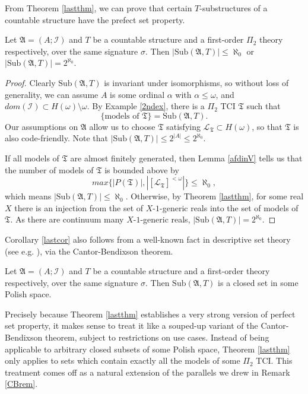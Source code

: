 \documentclass[12pt]{article}
\numberwithin{equation}{section}
\begin{document}
From Theorem \ref{lastthm}, we can prove that certain $T$-substructures of a countable structure have the prefect set property.

\begin{cor}\label{lastcor}
Let $\mathfrak{A} = (A; \mathcal{I})$ and $T$ be a countable structure and a first-order $\Pi_2$ theory respectively, over the same signature $\sigma$. Then $|\mathrm{Sub}(\mathfrak{A}, T)| \leq \aleph_0$ or $|\mathrm{Sub}(\mathfrak{A}, T)| = 2^{\aleph_0}$.
\end{cor}

\begin{proof}
Clearly $\mathrm{Sub}(\mathfrak{A}, T)$ is invariant under isomorphisms, so without loss of generality, we can assume $A$ is some ordinal $\alpha$ with $\alpha \leq \omega$, and $dom(\mathcal{I}) \subset H(\omega) \setminus \omega$. By Example \ref{2ndex}, there is a $\Pi_2$ TCI $\mathfrak{T}$ such that $$\{ \text{models of } \mathfrak{T}\} = \mathrm{Sub}(\mathfrak{A}, T).$$ Our assumptions on $\mathfrak{A}$ allow us to choose $\mathfrak{T}$ satisfying $\mathcal{L}_{\mathfrak{T}} \subset H(\omega)$, so that $\mathfrak{T}$ is also code-friendly. Note that $|\mathrm{Sub}(\mathfrak{A}, T)| \leq 2^{|A|} \leq 2^{\aleph_0}$.

If all models of $\mathfrak{T}$ are almost finitely generated, then Lemma \ref{afdinV} tells us that the number of models of $\mathfrak{T}$ is bounded above by $$max\{|P(\mathfrak{T})|, |[\mathcal{L}_{\mathfrak{T}}]^{< \omega}|\} \leq \aleph_0,$$ which means $|\mathrm{Sub}(\mathfrak{A}, T)| \leq \aleph_0$. Otherwise, by Theorem \ref{lastthm}, for some real $X$ there is an injection from the set of $X$-$1$-generic reals into the set of models of $\mathfrak{T}$. As there are continuum many $X$-$1$-generic reals, $|\mathrm{Sub}(\mathfrak{A}, T)| = 2^{\aleph_0}$.
\end{proof}

Corollary \ref{lastcor} also follows from a well-known fact in descriptive set theory (see e.g. \cite{kechris}), via the Cantor-Bendixson theorem. 

\begin{fact}\label{lastfact}
Let $\mathfrak{A} = (A; \mathcal{I})$ and $T$ be a countable structure and a first-order theory respectively, over the same signature $\sigma$. Then $\mathrm{Sub}(\mathfrak{A}, T)$ is a closed set in some Polish space.
\end{fact}

Precisely because Theorem \ref{lastthm} establishes a very strong version of perfect set property, it makes sense to treat it like a souped-up variant of the Cantor-Bendixson theorem, subject to restrictions on use cases. Instead of being applicable to arbitrary closed subsets of some Polish space, Theorem \ref{lastthm} only applies to sets which contain exactly all the models of some $\Pi_2$ TCI. This treatment comes off as a natural extension of the parallels we drew in Remark \ref{CBrem}.
\end{document}
